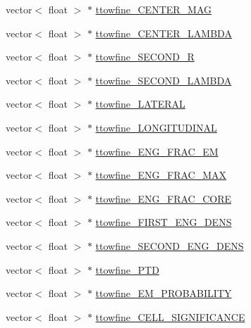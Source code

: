 \begin{DoxyCompactItemize}
vector$<$ float $>$ $\ast$ \hyperlink{classXMLWriter_a63a878193857b3039fbd95f01f3c0019}{ttowfine\+\_\+\+C\+E\+N\+T\+E\+R\+\_\+\+M\+AG}
\item 
vector$<$ float $>$ $\ast$ \hyperlink{classXMLWriter_a20b34280cb88cde5fc226d0ca18dd2b4}{ttowfine\+\_\+\+C\+E\+N\+T\+E\+R\+\_\+\+L\+A\+M\+B\+DA}
\item 
vector$<$ float $>$ $\ast$ \hyperlink{classXMLWriter_ac824959fe6505f8dcbd9f3a86ea51a2c}{ttowfine\+\_\+\+S\+E\+C\+O\+N\+D\+\_\+R}
\item 
vector$<$ float $>$ $\ast$ \hyperlink{classXMLWriter_ad93b6fe67bd9202410d62c1900057265}{ttowfine\+\_\+\+S\+E\+C\+O\+N\+D\+\_\+\+L\+A\+M\+B\+DA}
\item 
vector$<$ float $>$ $\ast$ \hyperlink{classXMLWriter_a263b26f72513d17226bb4be103ce0e09}{ttowfine\+\_\+\+L\+A\+T\+E\+R\+AL}
\item 
vector$<$ float $>$ $\ast$ \hyperlink{classXMLWriter_ae5a6ee570a7ad27205e02a6ea2d90907}{ttowfine\+\_\+\+L\+O\+N\+G\+I\+T\+U\+D\+I\+N\+AL}
\item 
vector$<$ float $>$ $\ast$ \hyperlink{classXMLWriter_a048fa7fa6b9db945d0c089c0d7e74b86}{ttowfine\+\_\+\+E\+N\+G\+\_\+\+F\+R\+A\+C\+\_\+\+EM}
\item 
vector$<$ float $>$ $\ast$ \hyperlink{classXMLWriter_a58c3b83d887f622366a5149e32f5025c}{ttowfine\+\_\+\+E\+N\+G\+\_\+\+F\+R\+A\+C\+\_\+\+M\+AX}
\item 
vector$<$ float $>$ $\ast$ \hyperlink{classXMLWriter_a18c284c47b42cab4e5834fc556300ee3}{ttowfine\+\_\+\+E\+N\+G\+\_\+\+F\+R\+A\+C\+\_\+\+C\+O\+RE}
\item 
vector$<$ float $>$ $\ast$ \hyperlink{classXMLWriter_a075b633e50a0151ae1a74e93a32baf6f}{ttowfine\+\_\+\+F\+I\+R\+S\+T\+\_\+\+E\+N\+G\+\_\+\+D\+E\+NS}
\item 
vector$<$ float $>$ $\ast$ \hyperlink{classXMLWriter_ad0b1a2f4242b6ba812e6baef6d12af29}{ttowfine\+\_\+\+S\+E\+C\+O\+N\+D\+\_\+\+E\+N\+G\+\_\+\+D\+E\+NS}
\item 
vector$<$ float $>$ $\ast$ \hyperlink{classXMLWriter_ad8791f43318f4fdee6da2de458d15697}{ttowfine\+\_\+\+P\+TD}
\item 
vector$<$ float $>$ $\ast$ \hyperlink{classXMLWriter_a3518d06091e27919d457a93f5a60847e}{ttowfine\+\_\+\+E\+M\+\_\+\+P\+R\+O\+B\+A\+B\+I\+L\+I\+TY}
\item 
vector$<$ float $>$ $\ast$ \hyperlink{classXMLWriter_a6d76e405b490e6498f525bc44ea89d2a}{ttowfine\+\_\+\+C\+E\+L\+L\+\_\+\+S\+I\+G\+N\+I\+F\+I\+C\+A\+N\+CE}
\item 

\end{DoxyCompactItemize}
